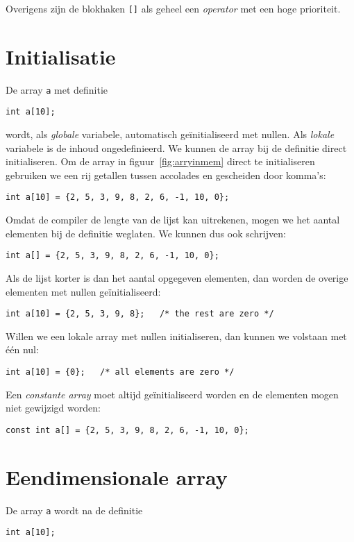 Overigens zijn de blokhaken \texttt{[]} als geheel een \textsl{operator}\indexop{[]} met een hoge prioriteit.

\section{Initialisatie}
De array \texttt{a} met definitie

\hspace*{1em}\texttt{int a[10];}

wordt, als \textsl{globale} variabele, automatisch geïnitialiseerd met nullen. Als \textsl{lokale} variabele is de inhoud ongedefinieerd. We kunnen de array bij de definitie direct initialiseren. Om de array in figuur~\ref{fig:arryinmem} direct te initialiseren gebruiken we een rij getallen tussen accolades en gescheiden door komma's:

\hspace*{1em}\texttt{int a[10] = \{2, 5, 3, 9, 8, 2, 6, -1, 10, 0\};}

Omdat de compiler de lengte van de lijst kan uitrekenen, mogen we het aantal elementen bij de definitie weglaten. We kunnen dus ook schrijven:

\hspace*{1em}\texttt{int a[] = \{2, 5, 3, 9, 8, 2, 6, -1, 10, 0\};}

Als de lijst korter is dan het aantal opgegeven elementen, dan worden de overige elementen met nullen geïnitialiseerd:

\hspace*{1em}\texttt{int a[10] = \{2, 5, 3, 9, 8\}; \ \ /* the rest are zero */} 

Willen we een lokale array met nullen initialiseren, dan kunnen we volstaan met één nul:

\hspace*{1em}\texttt{int a[10] = \{0\}; \ \ /* all elements are zero */} 

Een \textsl{constante array} moet altijd geïnitialiseerd worden en de elementen mogen niet gewijzigd worden:

\hspace*{1em}\texttt{const int a[] = \{2, 5, 3, 9, 8, 2, 6, -1, 10, 0\};}

\section{Eendimensionale array}
De array \texttt{a} wordt na de definitie

\hspace*{1em}\texttt{int a[10];}

